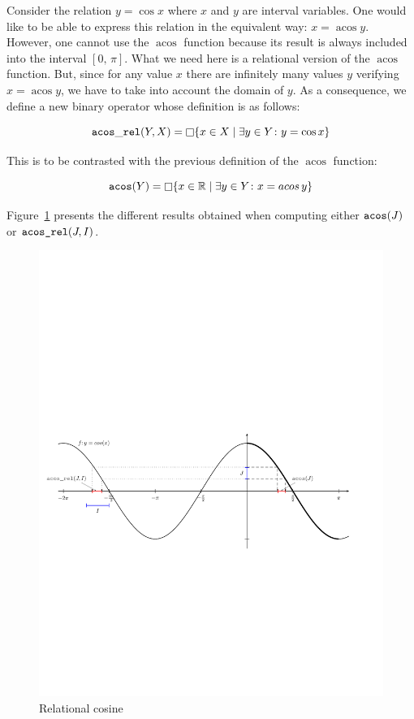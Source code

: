 \documentclass{manual}
\newcommand{\itv}[2]{\ensuremath{[#1,\,#2]}}
\newcommand{\hull}[1]{\ensuremath{\mathop{\Box} #1}}
\begin{document}
Consider the relation $y = \cos x$ where $x$ and $y$ are
interval variables. One would like to be able to express this relation
in the equivalent way: $x = \mathop{acos} y$. However, one cannot use the
$\mathop{acos}$ function because its result is always included into the
interval \itv{0}{\pi}. What we need here is a relational
version of the $\mathop{acos}$ function. But, since for any value $x$
there are infinitely many values $y$ verifying $x=\mathop{acos} y$, we
have to take into account the domain of $y$. As a consequence, we
define a new binary operator  whose definition is as
follows:

\begin{equation*}
{\tt\mathop{acos\_rel}}(Y,X)=\hull{\{x\in X\mid\exists y\in Y\colon y=\cos x\}}
\end{equation*}

\noindent
This is to be contrasted with the previous definition of the
$\mathop{acos}$ function:

\begin{equation*}
\code{acos}(Y)=\hull{\{x\in\RSet\mid\exists y\in Y\colon x=\mathop{acos} y\}}
\end{equation*}

\noindent
Figure~\ref{fig:relational-cos} presents the different results obtained when computing
either $\texttt{acos}(J)$ or $\texttt{acos\_rel}(J,I)$.

\begin{figure}
 \includegraphics[width=.9\marginparwidth,bb=11 262 553 470]{relation-cos}
  \caption{Relational cosine}
  \label{fig:relational-cos}
\end{figure}
\end{document}
